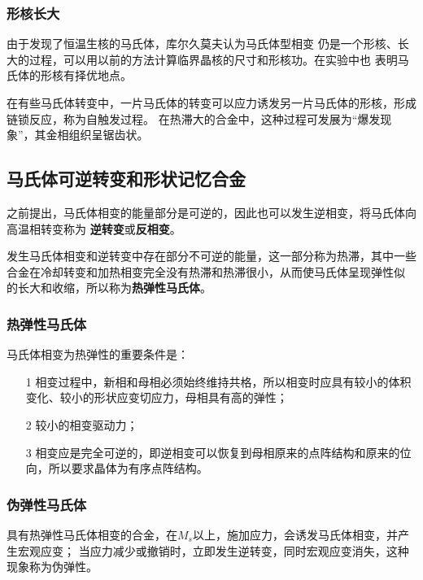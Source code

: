             \subsubsection{形核长大}
                由于发现了恒温生核的马氏体，库尔久莫夫认为马氏体型相变
                仍是一个形核、长大的过程，可以用以前的方法计算临界晶核的尺寸和形核功。在实验中也
                表明马氏体的形核有择优地点。

                在有些马氏体转变中，一片马氏体的转变可以应力诱发另一片马氏体的形核，形成链锁反应，称为自触发过程。
                在热滞大的合金中，这种过程可发展为“爆发现象”，其金相组织呈锯齿状。
        \subsection{马氏体可逆转变和形状记忆合金}
            之前提出，马氏体相变的能量部分是可逆的，因此也可以发生逆相变，将马氏体向高温相转变称为
            \textbf{逆转变}或\textbf{反相变}。

            发生马氏体相变和逆转变中存在部分不可逆的能量，这一部分称为热滞，其中一些
            合金在冷却转变和加热相变完全没有热滞和热滞很小，从而使马氏体呈现弹性似
            的长大和收缩，所以称为\textbf{热弹性马氏体}。
            \subsubsection{热弹性马氏体}
                马氏体相变为热弹性的重要条件是：
                \begin{itemize}
                    \item[1] 相变过程中，新相和母相必须始终维持共格，所以相变时应具有较小的体积变化、较小的形状应变切应力，母相具有高的弹性；
                    \item[2] 较小的相变驱动力；
                    \item[3] 相变应是完全可逆的，即逆相变可以恢复到母相原来的点阵结构和原来的位向，所以要求晶体为有序点阵结构。
                \end{itemize}
            \subsubsection{伪弹性马氏体}
                具有热弹性马氏体相变的合金，在$M_s$以上，施加应力，会诱发马氏体相变，并产生宏观应变；
                当应力减少或撤销时，立即发生逆转变，同时宏观应变消失，这种现象称为伪弹性。


